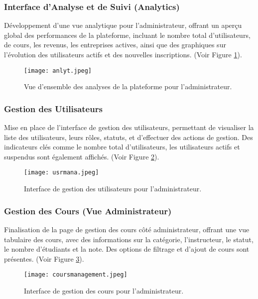 \documentclass[12pt, a4paper]{article}
\begin{document}
\subsubsection{Interface d'Analyse et de Suivi (Analytics)}
Développement d'une vue analytique pour l'administrateur, offrant un aperçu global des performances de la plateforme, incluant le nombre total d'utilisateurs, de cours, les revenus, les entreprises actives, ainsi que des graphiques sur l'évolution des utilisateurs actifs et des nouvelles inscriptions. (Voir Figure \ref{fig:admin_analytics}).

\begin{figure}[htbp]
  \centering
  \texttt{[image: anlyt.jpeg]} 
  \caption{Vue d'ensemble des analyses de la plateforme pour l'administrateur.}
  \label{fig:admin_analytics}
\end{figure}

\subsubsection{Gestion des Utilisateurs}
Mise en place de l'interface de gestion des utilisateurs, permettant de visualiser la liste des utilisateurs, leurs rôles, statuts, et d'effectuer des actions de gestion. Des indicateurs clés comme le nombre total d'utilisateurs, les utilisateurs actifs et suspendus sont également affichés. (Voir Figure \ref{fig:admin_user_management}).

\begin{figure}[htbp]
  \centering
  \texttt{[image: usrmana.jpeg]} 
  \caption{Interface de gestion des utilisateurs pour l'administrateur.}
  \label{fig:admin_user_management}
\end{figure}

\subsubsection{Gestion des Cours (Vue Administrateur)}
Finalisation de la page de gestion des cours côté administrateur, offrant une vue tabulaire des cours, avec des informations sur la catégorie, l'instructeur, le statut, le nombre d'étudiants et la note. Des options de filtrage et d'ajout de cours sont présentes. (Voir Figure \ref{fig:admin_course_management}).

\begin{figure}[htbp]
  \centering
  \texttt{[image: coursmanagement.jpeg]} 
  \caption{Interface de gestion des cours pour l'administrateur.}
  \label{fig:admin_course_management}
\end{figure}
\end{document}
